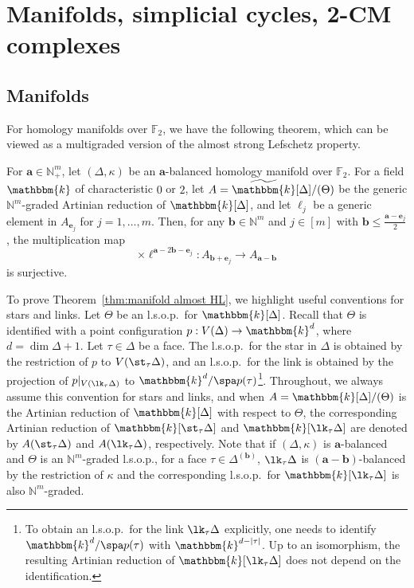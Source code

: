 \section{Manifolds, simplicial cycles, 2-CM complexes}
\subsection{Manifolds}
For homology manifolds over $\mathbb{F}_2$, we have the following theorem, which can be viewed as a multigraded version of the almost strong Lefschetz property.
\begin{theorem} \label{thm:manifold almost HL}
For $\bm{a} \in \mathbb{N}^m_+$, let $(\Delta,\kappa)$ be an $\bm{a}$-balanced homology manifold over $\mathbb{F}_2$.
For a field $\mathbbm{k}$ of characteristic $0$ or $2$, let $A=\widetilde{\mathbbm{k}}[\Delta]/(\Theta)$ be the generic $\mathbb{N}^m$-graded Artinian reduction of $\mathbbm{k}[\Delta]$, and let $\ell_j$ be a generic element in $A_{\bm{e}_j}$ for $j=1,\ldots,m$.
Then, for any $\bm{b} \in \mathbb{N}^m$ and $j \in [m]$ with $\bm{b} \leq \frac{\bm{a}-\bm{e}_j}{2}$, the multiplication map
\[
\times \bm{\ell}^{\bm{a}-2\bm{b}-\bm{e}_j} : A_{\bm{b}+\bm{e}_j} \to A_{\bm{a}-\bm{b}}
\]
is surjective.
\end{theorem}
To prove Theorem~\ref{thm:manifold almost HL}, we highlight useful conventions for stars and links.
Let $\Theta$ be an l.s.o.p.~for $\mathbbm{k}[\Delta]$.
Recall that $\Theta$ is identified with a point configuration $p:V(\Delta) \rightarrow \mathbbm{k}^{d}$, where $d=\dim \Delta +1$.
Let $\tau \in \Delta$ be a face.
The l.s.o.p.~for the star in $\Delta$ is obtained by the restriction of $p$ to $V(\st_\tau \Delta)$, and an l.s.o.p.~for the link is obtained by the projection of $p|_{V(\lk_\tau \Delta)}$ to $\mathbbm{k}^{d}/\spa p(\tau)$\footnote{To obtain an l.s.o.p.~for the link $\lk_\tau \Delta$ explicitly, one needs to identify $\mathbbm{k}^{d}/\spa p(\tau)$ with $\mathbbm{k}^{d-|\tau|}$. Up to an isomorphism, the resulting Artinian reduction of $\mathbbm{k}[\lk_\tau \Delta]$ does not depend on the identification.}.
Throughout, we always assume this convention for stars and links, and when $A=\mathbbm{k}[\Delta]/(\Theta)$ is the Artinian reduction of $\mathbbm{k}[\Delta]$ with respect to $\Theta$, the corresponding Artinian reduction of $\mathbbm{k}[\st_\tau \Delta]$ and $\mathbbm{k}[\lk_\tau \Delta]$ are denoted by $A(\st_\tau \Delta)$ and $A(\lk_\tau \Delta)$, respectively.
Note that if $(\Delta,\kappa)$ is $\bm{a}$-balanced and $\Theta$ is an $\mathbb{N}^m$-graded l.s.o.p., for a face $\tau \in \Delta^{(\bm{b})}$, $\lk_\tau \Delta$ is $(\bm{a}-\bm{b})$-balanced by the restriction of $\kappa$ and the corresponding l.s.o.p.~for $\mathbbm{k}[\lk_\tau \Delta]$ is also $\mathbb{N}^m$-graded.
